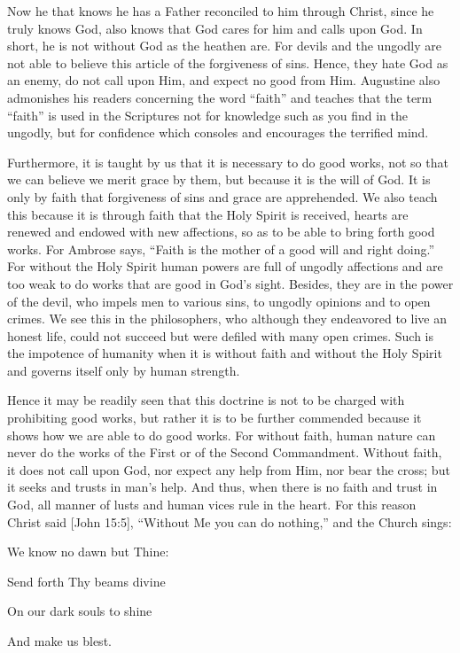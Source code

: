 Now he that knows he has a Father reconciled to him through Christ, since he truly knows God, also knows that God cares for him and calls upon God. In short, he is not without God as the heathen are. For devils and the ungodly are not able to believe this article of the forgiveness of sins. Hence, they hate God as an enemy, do not call upon Him, and expect no good from Him. Augustine also admonishes his readers concerning the word “faith” and teaches that the term “faith” is used in the Scriptures not for knowledge such as you find in the ungodly, but for confidence which consoles and encourages the terrified mind.

Furthermore, it is taught by us that it is necessary to do good works, not so that we can believe we merit grace by them, but because it is the will of God. It is only by faith that forgiveness of sins and grace are apprehended. We also teach this because it is through faith that the Holy Spirit is received, hearts are renewed and endowed with new affections, so as to be able to bring forth good works. For Ambrose says, “Faith is the mother of a good will and right doing.” For without the Holy Spirit human powers are full of ungodly affections and are too weak to do works that are good in God’s sight. Besides, they are in the power of the devil, who impels men to various sins, to ungodly opinions and to open crimes. We see this in the philosophers, who although they endeavored to live an honest life, could not succeed but were defiled with many open crimes. Such is the impotence of humanity when it is without faith and without the Holy Spirit and governs itself only by human strength.

Hence it may be readily seen that this doctrine is not to be charged with prohibiting good works, but rather it is to be further commended because it shows how we are able to do good works. For without faith, human nature can never do the works of the First or of the Second Commandment. Without faith, it does not call upon God, nor expect any help from Him, nor bear the cross; but it seeks and trusts in man’s help. And thus, when there is no faith and trust in God, all manner of lusts and human vices rule in the heart. For this reason Christ said [John 15:5], “Without Me you can do nothing,” and the Church sings:

We know no dawn but Thine:

Send forth Thy beams divine

On our dark souls to shine

And make us blest.

